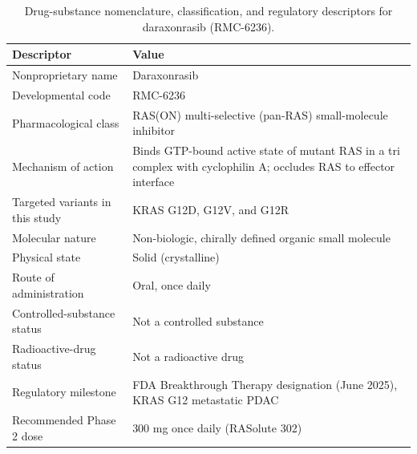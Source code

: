 \begin{table}[t]
\centering
\caption{Drug-substance nomenclature, classification, and regulatory descriptors
for daraxonrasib (RMC-6236).}
\label{tab:cmc-ds-nomenclature}
\begin{tabularx}{\textwidth}{L{5.1cm} Y}
\toprule
\textbf{Descriptor} & \textbf{Value} \\
\midrule
Nonproprietary name & Daraxonrasib \\
Developmental code & RMC-6236 \\
Pharmacological class & RAS(ON) multi-selective (pan-RAS) small-molecule inhibitor \\
Mechanism of action & Binds GTP-bound active state of mutant RAS in a tri complex with cyclophilin A; occludes RAS to effector interface \\
Targeted variants in this study & KRAS G12D, G12V, and G12R \\
Molecular nature & Non-biologic, chirally defined organic small molecule \\
Physical state & Solid (crystalline) \\
Route of administration & Oral, once daily \\
Controlled-substance status & Not a controlled substance \\
Radioactive-drug status & Not a radioactive drug \\
Regulatory milestone & FDA Breakthrough Therapy designation (June 2025), KRAS G12 metastatic PDAC \\
Recommended Phase 2 dose & 300 mg once daily (RASolute 302) \\
\bottomrule
\end{tabularx}
\vspace*{-0.2cm}
\end{table}

